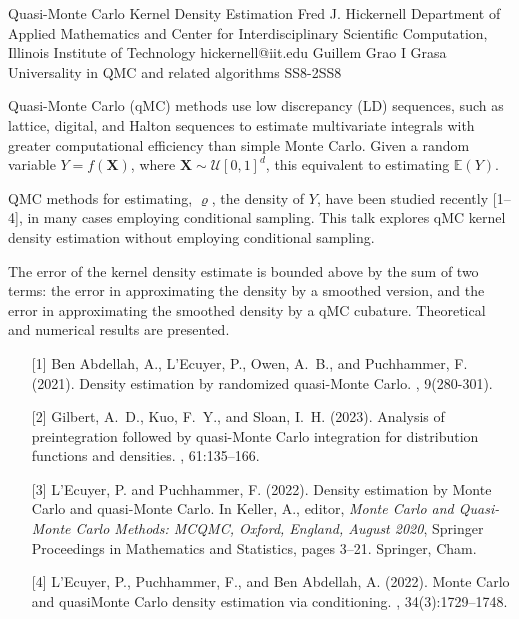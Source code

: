 \begin{talk}
  {Quasi-Monte Carlo Kernel Density Estimation}%
  {Fred J. Hickernell}%
  {Department of Applied Mathematics and Center for Interdisciplinary Scientific Computation, Illinois Institute of Technology}%
  {hickernell@iit.edu}%
  {Guillem Grao I Grasa}%
{Universality in QMC and related algorithms}
{}{SS8-2}{SS8}

			
Quasi-Monte Carlo (qMC) methods use low discrepancy (LD) sequences, such as lattice, digital, and Halton sequences to estimate multivariate integrals with greater computational efficiency than simple Monte Carlo.  Given a random variable $Y = f(\boldsymbol{X})$, where $\boldsymbol{X} \sim \mathcal{U}[0,1]^d$, this equivalent to estimating $\mathbb{E}(Y)$.

QMC methods for estimating, $\varrho$, the density of $Y$, have been studied recently %
[1--4], in many cases employing conditional sampling.
This talk explores qMC kernel density estimation without employing conditional sampling.  

The error of the kernel density estimate is bounded above by the sum of two terms:  the error in approximating the density by a smoothed version, and the error in approximating the smoothed density by a qMC cubature.   Theoretical and numerical results are presented.

\medskip

\begin{enumerate}
	\item[{[1]}]
{Ben Abdellah}, A., L'Ecuyer, P., Owen, A.~B., and Puchhammer, F. (2021).
\newblock Density estimation by randomized quasi-{M}onte {C}arlo.
, 9(280-301).

\item[{[2]}]
Gilbert, A.~D., Kuo, F.~Y., and Sloan, I.~H. (2023).
\newblock Analysis of preintegration followed by quasi-{M}onte {C}arlo integration for distribution functions and densities.
, 61:135--166.

\item[{[3]}]
L'Ecuyer, P. and Puchhammer, F. (2022).
\newblock Density estimation by {M}onte {C}arlo and quasi-{M}onte {C}arlo.
\newblock In Keller, A., editor, {\em {M}onte {C}arlo and Quasi-{M}onte {C}arlo Methods: {MCQMC}, {O}xford, England, {A}ugust 2020}, Springer Proceedings in Mathematics and Statistics, pages 3--21. Springer, Cham.

\item[{[4]}]
L'Ecuyer, P., Puchhammer, F., and {Ben Abdellah}, A. (2022).
\newblock Monte Carlo and quasi{\textendash}{M}onte {C}arlo density estimation via conditioning.
, 34(3):1729--1748.
\end{enumerate}


\end{talk}

